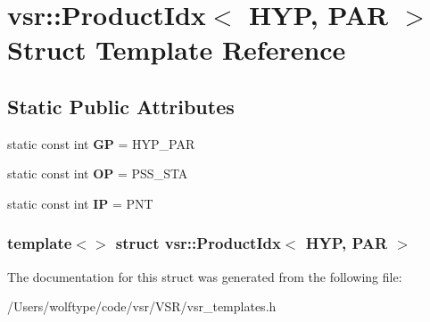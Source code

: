 \hypertarget{structvsr_1_1_product_idx_3_01_h_y_p_00_01_p_a_r_01_4}{\section{vsr\-:\-:Product\-Idx$<$ H\-Y\-P, P\-A\-R $>$ Struct Template Reference}
\label{structvsr_1_1_product_idx_3_01_h_y_p_00_01_p_a_r_01_4}
}
\subsection*{Static Public Attributes}
\begin{DoxyCompactItemize}
\item 
\hypertarget{structvsr_1_1_product_idx_3_01_h_y_p_00_01_p_a_r_01_4_a7322b91faca4ceb346fcdd704682fca4}{static const int {\bfseries G\-P} = H\-Y\-P\-\_\-\-P\-A\-R}\label{structvsr_1_1_product_idx_3_01_h_y_p_00_01_p_a_r_01_4_a7322b91faca4ceb346fcdd704682fca4}

\item 
\hypertarget{structvsr_1_1_product_idx_3_01_h_y_p_00_01_p_a_r_01_4_a4ec7921cb6d5874c363098d8af88a484}{static const int {\bfseries O\-P} = P\-S\-S\-\_\-\-S\-T\-A}\label{structvsr_1_1_product_idx_3_01_h_y_p_00_01_p_a_r_01_4_a4ec7921cb6d5874c363098d8af88a484}

\item 
\hypertarget{structvsr_1_1_product_idx_3_01_h_y_p_00_01_p_a_r_01_4_a089ef0eac5932ee579016175a5afcbd6}{static const int {\bfseries I\-P} = P\-N\-T}\label{structvsr_1_1_product_idx_3_01_h_y_p_00_01_p_a_r_01_4_a089ef0eac5932ee579016175a5afcbd6}

\end{DoxyCompactItemize}
\subsubsection*{template$<$$>$ struct vsr\-::\-Product\-Idx$<$ H\-Y\-P, P\-A\-R $>$}



The documentation for this struct was generated from the following file\-:\begin{DoxyCompactItemize}
\item 
/\-Users/wolftype/code/vsr/\-V\-S\-R/vsr\-\_\-templates.\-h\end{DoxyCompactItemize}
